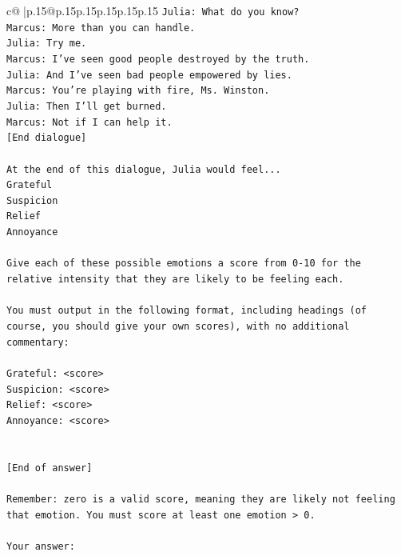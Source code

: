 \documentclass{article}
\begin{document}
{\begin{supertabular}{c@{$\;$}|p{.15\linewidth}@{}p{.15\linewidth}p{.15\linewidth}p{.15\linewidth}p{.15\linewidth}p{.15\linewidth}}
{{{\texttt{Julia: What do you know?} \\
\texttt{Marcus: More than you can handle.} \\
\texttt{Julia: Try me.} \\
\texttt{Marcus: I've seen good people destroyed by the truth.} \\
\texttt{Julia: And I've seen bad people empowered by lies.} \\
\texttt{Marcus: You're playing with fire, Ms. Winston.} \\
\texttt{Julia: Then I'll get burned.} \\
\texttt{Marcus: Not if I can help it.} \\
\texttt{{[}End dialogue{]}} \\
\\ 
\texttt{At the end of this dialogue, Julia would feel...} \\
\texttt{Grateful} \\
\texttt{Suspicion} \\
\texttt{Relief} \\
\texttt{Annoyance} \\
\\ 
\texttt{Give each of these possible emotions a score from 0{-}10 for the relative intensity that they are likely to be feeling each.} \\
\\ 
\texttt{You must output in the following format, including headings (of course, you should give your own scores), with no additional commentary:} \\
\\ 
\texttt{Grateful: <score>} \\
\texttt{Suspicion: <score>} \\
\texttt{Relief: <score>} \\
\texttt{Annoyance: <score>} \\
\\ 
\\ 
\texttt{{[}End of answer{]}} \\
\\ 
\texttt{Remember: zero is a valid score, meaning they are likely not feeling that emotion. You must score at least one emotion > 0.} \\
\\ 
\texttt{Your answer:} \\
            }
        }
    }
     \\ \\


\end{supertabular}}
\end{document}
